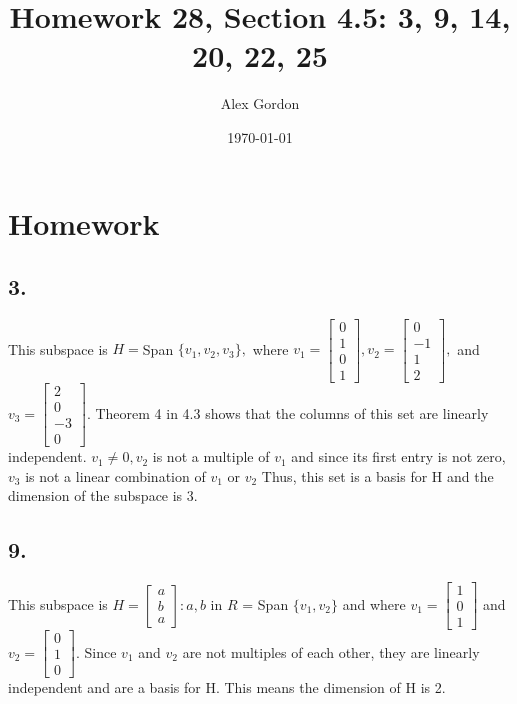 \documentclass[12]{scrartcl}
\begin{document}
\title{Homework 28, Section 4.5: 3, 9, 14, 20, 22, 25}
\author{Alex Gordon}
\date{\today}
\maketitle
\section*{Homework}
\subsection*{3.}
This subspace is $H = $Span $\{v_1, v_2, v_3\}, $ where $v_1 =  \begin{bmatrix} 0 \\ 1 \\ 0 \\ 1  \end{bmatrix}, v_2 =  \begin{bmatrix} 0 \\ -1 \\ 1 \\ 2  \end{bmatrix},$ and $v_3 =  \begin{bmatrix} 2 \\ 0 \\ -3 \\ 0  \end{bmatrix}$. Theorem 4 in 4.3 shows that the columns of this set are linearly independent. $v_1 \neq 0, v_2$ is not a multiple of $v_1$ and since its first entry is not zero, $v_3$ is not a linear combination of $v_1$ or $v_2$ Thus, this set is a basis for H and the dimension of the subspace is 3. 
\subsection*{9.}
This subspace is $H = \begin{bmatrix} a \\ b \\ a  \end{bmatrix}: a, b $ in $R$ = Span $\{v_1, v_2 \}$ and where $v_1 = \begin{bmatrix} 1 \\ 0 \\ 1 \end{bmatrix}$ and $v_2 = \begin{bmatrix} 0 \\ 1 \\ 0 \end{bmatrix}$. Since $v_1$ and $v_2$ are not multiples of each other, they are linearly independent and are a basis for H. This means the dimension of H is 2. 
\end{document}
